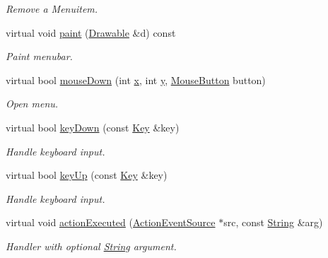\begin{DoxyCompactItemize}
\begin{DoxyCompactList}\small\item\em Remove a Menuitem. \end{DoxyCompactList}\item 
\hypertarget{classGUI_1_1Menubar_a3be8a96a403edb1290c4191d24ee5c2f}{virtual void \hyperlink{classGUI_1_1Menubar_a3be8a96a403edb1290c4191d24ee5c2f}{paint} (\hyperlink{classGUI_1_1Drawable}{Drawable} \&d) const }\label{classGUI_1_1Menubar_a3be8a96a403edb1290c4191d24ee5c2f}

\begin{DoxyCompactList}\small\item\em Paint menubar. \end{DoxyCompactList}\item 
\hypertarget{classGUI_1_1Menubar_a00513768b10b8d834e1ae04fde493663}{virtual bool \hyperlink{classGUI_1_1Menubar_a00513768b10b8d834e1ae04fde493663}{mouse\-Down} (int \hyperlink{classGUI_1_1Window_a6ca6a80ca00c9e1d8ceea8d3d99a657d}{x}, int \hyperlink{classGUI_1_1Window_a0ee8e923aff2c3661fc2e17656d37adf}{y}, \hyperlink{namespaceGUI_ad06082a7b02aa73697f39eb8e0856de9}{Mouse\-Button} button)}\label{classGUI_1_1Menubar_a00513768b10b8d834e1ae04fde493663}

\begin{DoxyCompactList}\small\item\em Open menu. \end{DoxyCompactList}\item 
\hypertarget{classGUI_1_1Menubar_a5521d59d85e4ebfe9fe83f186fa11c14}{virtual bool \hyperlink{classGUI_1_1Menubar_a5521d59d85e4ebfe9fe83f186fa11c14}{key\-Down} (const \hyperlink{classGUI_1_1Key}{Key} \&key)}\label{classGUI_1_1Menubar_a5521d59d85e4ebfe9fe83f186fa11c14}

\begin{DoxyCompactList}\small\item\em Handle keyboard input. \end{DoxyCompactList}\item 
\hypertarget{classGUI_1_1Menubar_a9126ca3688a30232b4adaf589f094b21}{virtual bool \hyperlink{classGUI_1_1Menubar_a9126ca3688a30232b4adaf589f094b21}{key\-Up} (const \hyperlink{classGUI_1_1Key}{Key} \&key)}\label{classGUI_1_1Menubar_a9126ca3688a30232b4adaf589f094b21}

\begin{DoxyCompactList}\small\item\em Handle keyboard input. \end{DoxyCompactList}\item 
virtual void \hyperlink{classGUI_1_1Menubar_af4c7d2663455b31660110c53c3d604e5}{action\-Executed} (\hyperlink{classGUI_1_1ActionEventSource}{Action\-Event\-Source} $\ast$src, const \hyperlink{classGUI_1_1String}{String} \&arg)
\begin{DoxyCompactList}\small\item\em Handler with optional \hyperlink{classGUI_1_1String}{String} argument. \end{DoxyCompactList}\end{DoxyCompactItemize}
